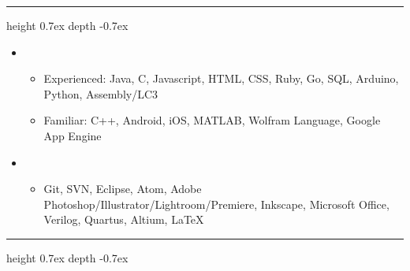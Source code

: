 \documentclass[10pt,letterpaper]{article}
\def\Vhrulefill{\leavevmode\leaders\hrule height 0.7ex depth \dimexpr0.4pt-0.7ex\hfill\kern0pt}
\begin{document}
%
%


\vspace{-.78mm}
\noindent \large{}  \Vhrulefill
\vspace{-.7mm}


\begin{itemize}[label={}]

 \item \small{}
 \vspace{-1.58mm}
 \begin{itemize}[label={}]
 	\item \small{Experienced: \hspace{3mm} Java, C, Javascript, HTML, CSS, Ruby, Go, SQL, Arduino, Python, Assembly/LC3}
 	\item \small{Familiar: \hspace{8mm} C++, Android, iOS, MATLAB, Wolfram Language, Google App Engine}
 \end{itemize}

  \item \small{}
 \vspace{-1.58mm}
 \begin{itemize}[label={}]
 	\item \small{Git, SVN, Eclipse, Atom, Adobe Photoshop/Illustrator/Lightroom/Premiere, Inkscape, Microsoft Office, Verilog, Quartus, Altium,  {\selectfont \LaTeX}}
 \end{itemize}
\end{itemize}



%
%


\vspace{-.78mm}
\noindent \large{}  \Vhrulefill
\vspace{-.7mm}
\end{document}
